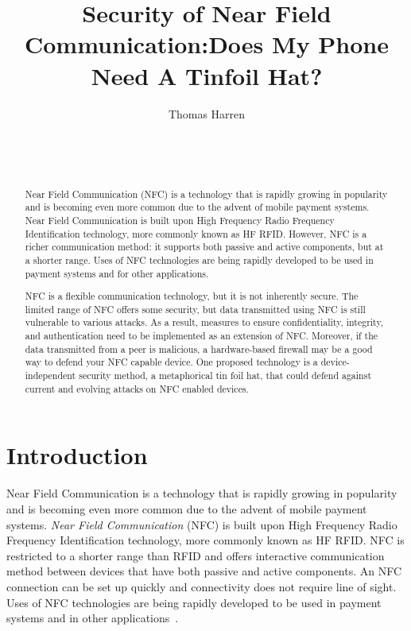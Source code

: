 \documentclass{sig-alternate}
\begin{document}

\title{Security of Near Field Communication:\break Does My Phone Need A Tinfoil Hat?}


\author{
\alignauthor
Thomas Harren\\
	\\
	\\
	\\
}

\maketitle
\begin{abstract}
Near Field Communication (NFC) is a technology that is rapidly growing in popularity and is becoming even more common due to the advent of mobile payment systems. Near Field Communication  is built upon High Frequency Radio Frequency Identification technology, more commonly known as HF RFID. However, NFC is a richer communication method: it supports both passive and active components, but at a shorter range. Uses of NFC technologies are being rapidly developed to be used in payment systems and for other applications.

NFC is a flexible communication technology, but it is not inherently secure. The limited range of NFC offers some security, but data transmitted using NFC is still vulnerable to various attacks. As a result, measures to ensure confidentiality, integrity, and authentication need to be implemented as an extension of NFC. Moreover, if the data transmitted from a peer is malicious, a hardware-based firewall may be a good way to defend your NFC capable device. One proposed technology is a device-independent security method, a metaphorical tin foil hat, that could defend against current and evolving attacks on NFC enabled devices.
\end{abstract}


\section{Introduction}
\label{sec:introduction}
Near Field Communication is a technology that is rapidly growing in popularity and is becoming even more common due to the advent of mobile payment systems. \textit{Near Field Communication} (NFC) is built upon High Frequency Radio Frequency Identification technology, more commonly known as HF RFID. NFC is restricted to a shorter range than RFID and offers interactive communication method between devices that have both passive and active components. An NFC connection can be set up quickly and connectivity does not require line of sight. Uses of NFC technologies are being rapidly developed to be used in payment systems and in other applications~\cite{Gum2013}.
\end{document}
